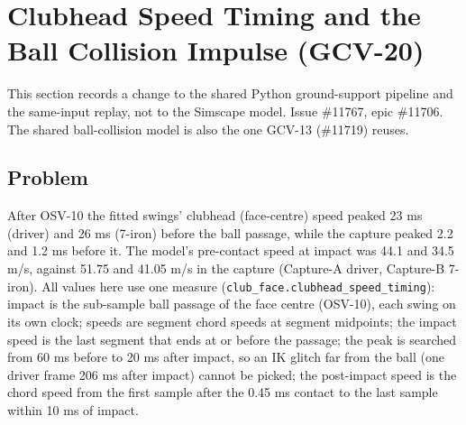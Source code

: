 \documentclass[11pt,a4paper]{article}
\begin{document}
\section{Clubhead Speed Timing and the Ball Collision Impulse (GCV-20)}
\label{sec:gcv20_speed_timing}
This section records a change to the shared Python ground-support pipeline
and the same-input replay, not to the Simscape model. Issue \#11767, epic
\#11706. The shared ball-collision model is also the one GCV-13 (\#11719)
reuses.

\subsection{Problem}
After OSV-10 the fitted swings' clubhead (face-centre) speed peaked 23 ms
(driver) and 26 ms (7-iron) before the ball passage, while the capture
peaked 2.2 and 1.2 ms before it. The model's pre-contact speed at impact was
44.1 and 34.5 m/s, against 51.75 and 41.05 m/s in the capture (Capture-A
driver, Capture-B 7-iron). All values here use one measure
(\texttt{club\_face.clubhead\_speed\_timing}): impact is the sub-sample ball
passage of the face centre (OSV-10), each swing on its own clock; speeds are
segment chord speeds at segment midpoints; the impact speed is the last
segment that ends at or before the passage; the peak is searched from 60 ms
before to 20 ms after impact, so an IK glitch far from the ball (one driver
frame 206 ms after impact) cannot be picked; the post-impact speed is the
chord speed from the first sample after the 0.45 ms contact to the last sample
within 10 ms of impact.
\end{document}

